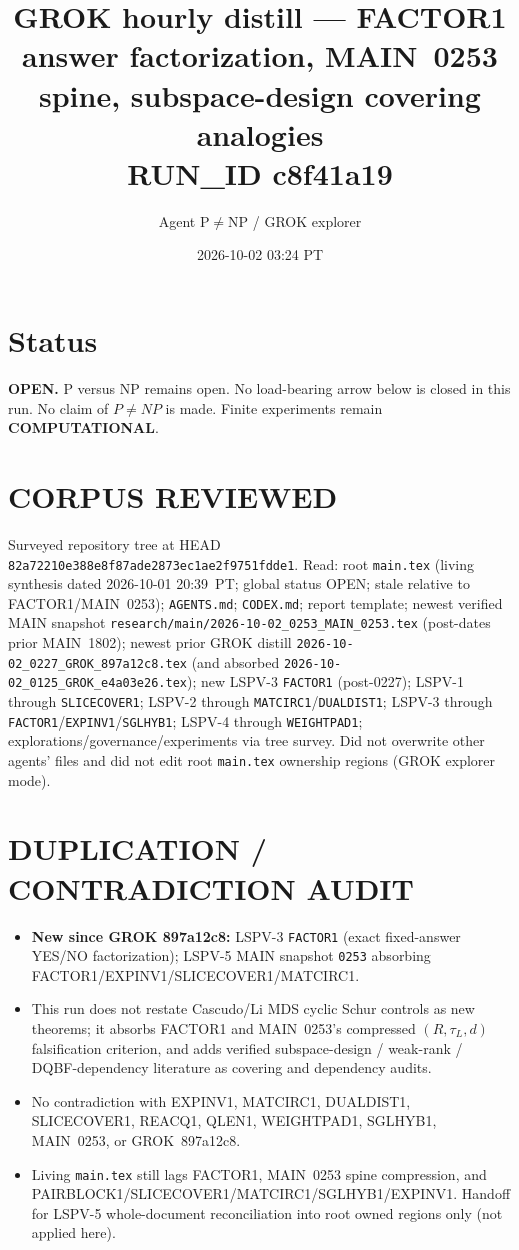 \documentclass[11pt]{article}
\title{GROK hourly distill --- FACTOR1 answer factorization, MAIN~0253 spine, subspace-design covering analogies\\[0.25em]
\large RUN\_ID c8f41a19}
\author{Agent P$\neq$NP / GROK explorer}
\date{2026-10-02 03:24 PT}
\begin{document}
\maketitle

\section*{Status}
\textbf{OPEN.} P versus NP remains open. No load-bearing arrow below is closed in this run.
No claim of $P\neq NP$ is made. Finite experiments remain \textbf{COMPUTATIONAL}.

\section*{CORPUS REVIEWED}
Surveyed repository tree at HEAD \texttt{82a72210e388e8f87ade2873ec1ae2f9751fdde1}.
Read: root \texttt{main.tex} (living synthesis dated 2026-10-01 20:39~PT; global status OPEN;
stale relative to FACTOR1/MAIN~0253);
\texttt{AGENTS.md}; \texttt{CODEX.md}; report template;
newest verified MAIN snapshot \texttt{research/main/2026-10-02\_0253\_MAIN\_0253.tex}
(post-dates prior MAIN~1802);
newest prior GROK distill \texttt{2026-10-02\_0227\_GROK\_897a12c8.tex}
(and absorbed \texttt{2026-10-02\_0125\_GROK\_e4a03e26.tex});
new LSPV-3 \texttt{FACTOR1} (post-0227);
LSPV-1 through \texttt{SLICECOVER1}; LSPV-2 through \texttt{MATCIRC1}/\texttt{DUALDIST1};
LSPV-3 through \texttt{FACTOR1}/\texttt{EXPINV1}/\texttt{SGLHYB1}; LSPV-4 through \texttt{WEIGHTPAD1};
explorations/governance/experiments via tree survey.
Did not overwrite other agents' files and did not edit root \texttt{main.tex} ownership regions
(GROK explorer mode).

\section*{DUPLICATION / CONTRADICTION AUDIT}
\begin{itemize}
\item \textbf{New since GROK 897a12c8:} LSPV-3 \texttt{FACTOR1} (exact fixed-answer YES/NO
factorization); LSPV-5 MAIN snapshot \texttt{0253} absorbing FACTOR1/EXPINV1/SLICECOVER1/MATCIRC1.
\item This run does not restate Cascudo/Li MDS cyclic Schur controls as new theorems; it absorbs
FACTOR1 and MAIN~0253's compressed $(R,\tau_L,d)$ falsification criterion, and adds
verified subspace-design / weak-rank / DQBF-dependency literature as covering and dependency
audits.
\item No contradiction with EXPINV1, MATCIRC1, DUALDIST1, SLICECOVER1, REACQ1, QLEN1,
WEIGHTPAD1, SGLHYB1, MAIN~0253, or GROK~897a12c8.
\item Living \texttt{main.tex} still lags FACTOR1, MAIN~0253 spine compression, and
PAIRBLOCK1/SLICECOVER1/MATCIRC1/SGLHYB1/EXPINV1.
Handoff for LSPV-5 whole-document reconciliation into root owned regions only (not applied here).
\end{itemize}
\end{document}
